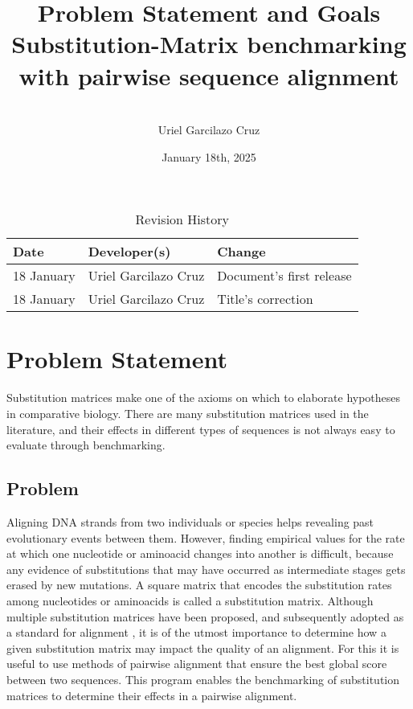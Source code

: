 \documentclass{article}
\title{Problem Statement and Goals\\Substitution-Matrix benchmarking with pairwise sequence alignment}
\author{\\Uriel Garcilazo Cruz}
\date{January 18th, 2025}
\begin{document}
\maketitle

\begin{table}[hp]
\caption{Revision History} \label{TblRevisionHistory}
\begin{tabularx}{\textwidth}{llX}
\toprule
\textbf{Date} & \textbf{Developer(s)} & \textbf{Change}\\
\midrule
18 January & Uriel Garcilazo Cruz & Document's first release\\
18 January & Uriel Garcilazo Cruz & Title's correction\\
\bottomrule
\end{tabularx}
\end{table}

\section{Problem Statement}

Substitution matrices make one of the axioms on which to elaborate hypotheses in comparative biology.
There are many substitution matrices used in the literature, 
and their effects in different types of sequences is not always easy to evaluate through benchmarking.

\subsection{Problem}

Aligning DNA strands from two individuals or species helps revealing past evolutionary events between them.
However, finding empirical values for the rate at which one nucleotide or aminoacid changes into another is difficult,
because any evidence of substitutions that may have occurred as intermediate stages gets erased by new mutations.
A square matrix that encodes the substitution rates among nucleotides or aminoacids is called a substitution matrix.
Although multiple substitution matrices have been proposed, and subsequently adopted as a standard for alignment \cite{Altschul1991,Mount2008},
it is of the utmost importance to determine how a given substitution matrix may impact the quality of an alignment.
For this it is useful to use methods of pairwise alignment \cite{NEEDLEMAN1970443} that ensure the best global score between two sequences.
This program enables the benchmarking of substitution matrices to determine their effects in a pairwise alignment.
\end{document}
